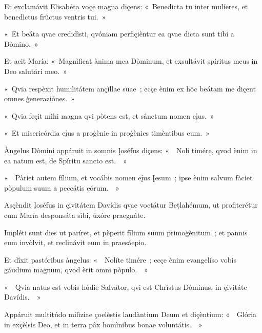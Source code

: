 Et exclamávit Elisabéța voçe magna diçens: «~Benedìcta tu inter mulíeres, et benedìctus frûctus ventris tui.~» 

«~Et beáta qvae credidìsti, qvóniam perfiçièntur ea qvae dicta sunt tibi a Dòmino.~» 

Et aeit María: «~Magnìficat ànima mea Dòminum, et exsultávit spíritus meus in Deo salutári meo.~» 

«~Qvia respèxit humilitátem ançìllae suae~; ecçe ènim ex hôc beátam me diçent omnes ģeneraziónes.~» 

«~Qvia feçit mìhi magna qvi pòtens est, et sânctum nomen eįus.~» 

«~Et misericórdia eįus a proģènie in proģènies timèntibus eum.~» 


Àngelus Dòmini appáruit in somnis Įoséfus diçens: «~~Noli timére, qvod ènim in ea natum est, de Spíritu sancto est.~~» 

«~~Pàriet autem fílium, et vocábis nomen eįus Įesum~; ipse ènim salvum fàciet pòpulum suum a peccátis eórum.~~» 

Asçèndit Įoséfus in çivitátem Davídis qvae voctátur Bețlahémum, ut profiterétur cum María desponsáta sìbi, ůxóre praegnáte. 

Impléti sunt dies ut paríret, et pèperit fílium suum primoģènitum~; et pannis eum invòlvit, et reclinávit eum in praesáepio. 

Et dîxit pastóribus àngelus: «~~Nolíte timére~; ecçe ènim evangelíso vobis gáudium magnum, qvod èrit omni pòpulo.~~» 

«~~Qvia natus est vobis hódie Salvátor, qvi est Chrîstus Dòminus, in çivitáte Davídis.~~» 

Appáruit multitúdo milìziae çoelèstis laudàntium Deum et diçèntium: «~~Glória in exçèlsis Deo, et in terra pâx homìnibus bonae voluntátis.~~» 

